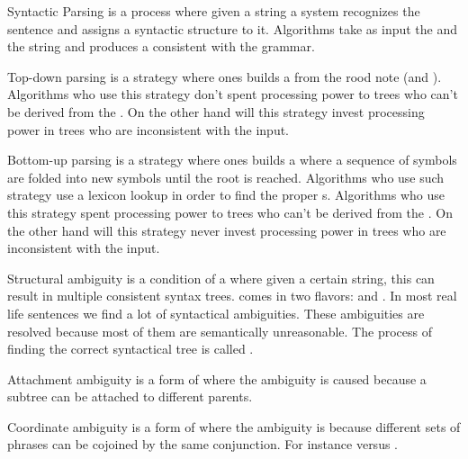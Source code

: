 \begin{df}{Syntactic Parsing}
\sb{} is a process where given a string a system recognizes the sentence and assigns a syntactic structure to it. Algorithms take as input the  and the string and produces a  consistent with the grammar.
\end{df}
\begin{df}{Top-down parsing}
\sb{} is a strategy where ones builds a  from the rood note (and ). Algorithms who use this strategy don't spent processing power to trees who can't be derived from the . On the other hand will this strategy invest processing power in trees who are inconsistent with the input.
\end{df}
\begin{df}{Bottom-up parsing}
\sb{} is a strategy where ones builds a  where a sequence of symbols are folded into new symbols until the root is reached. Algorithms who use such strategy use a lexicon lookup in order to find the proper s. Algorithms who use this strategy spent processing power to trees who can't be derived from the . On the other hand will this strategy never invest processing power in trees who are inconsistent with the input.
\end{df}
\begin{df}{Structural ambiguity}
\sb{} is a condition of a  where given a certain string, this can result in multiple consistent syntax trees. \sb{} comes in two flavors:  and . In most real life sentences we find a lot of syntactical ambiguities. These ambiguities are resolved because most of them are semantically unreasonable. The process of finding the correct syntactical tree is called .
\end{df}
\begin{df}{Attachment ambiguity}
\sb{} is a form of  where the ambiguity is caused because a subtree can be attached to different parents.
\end{df}
\begin{df}[Scope]{Coordinate ambiguity}
\sb{} is a form of  where the ambiguity is because different sets of phrases can be cojoined by the same conjunction. For instance  versus .
\end{df}
